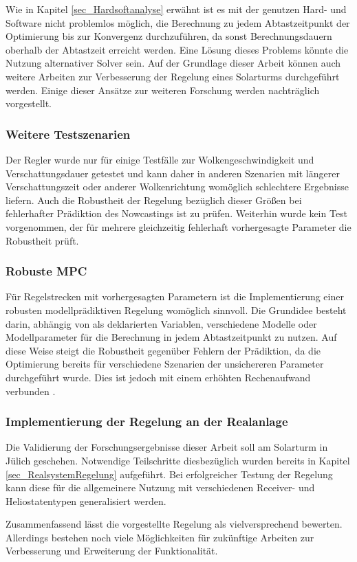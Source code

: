 Wie in Kapitel \ref{sec_Hardsoftanalyse} erwähnt ist es mit der genutzen Hard- und Software nicht problemlos möglich, die Berechnung zu jedem Abtastzeitpunkt der Optimierung bis zur Konvergenz durchzuführen, da sonst Berechnungsdauern oberhalb der Abtastzeit erreicht werden.
Eine Lösung dieses Problems könnte die Nutzung alternativer Solver sein.
Auf der Grundlage dieser Arbeit können auch weitere Arbeiten zur Verbesserung der Regelung eines Solarturms durchgeführt werden.
Einige dieser Ansätze zur weiteren Forschung werden nachträglich vorgestellt.

\subsubsection*{Weitere Testszenarien}
Der Regler wurde nur für einige Testfälle zur Wolkengeschwindigkeit und Verschattungsdauer getestet und kann daher in anderen Szenarien mit längerer Verschattungszeit oder anderer Wolkenrichtung womöglich schlechtere Ergebnisse liefern.
Auch die Robustheit der Regelung bezüglich dieser Größen bei fehlerhafter Prädiktion des Nowcastings ist zu prüfen.
Weiterhin wurde kein Test vorgenommen, der für mehrere gleichzeitig fehlerhaft vorhergesagte Parameter die Robustheit prüft.

\subsubsection*{Robuste MPC}
Für Regelstrecken mit vorhergesagten Parametern ist die Implementierung einer robusten modellprädiktiven Regelung womöglich sinnvoll.
Die Grundidee besteht darin, abhängig von als  deklarierten Variablen, verschiedene Modelle oder Modellparameter für die Berechnung in jedem Abtastzeitpunkt zu nutzen.
Auf diese Weise steigt die Robustheit gegenüber Fehlern der Prädiktion, da die Optimierung bereits für verschiedene Szenarien der unsichereren Parameter durchgeführt wurde.
Dies ist jedoch mit einem erhöhten Rechenaufwand verbunden \cite[S.6ff]{Schwenzer}.

\subsubsection*{Implementierung der Regelung an der Realanlage}
Die Validierung der Forschungsergebnisse dieser Arbeit soll am Solarturm in Jülich geschehen.
Notwendige Teilschritte diesbezüglich wurden bereits in Kapitel \ref{sec_RealsystemRegelung} aufgeführt.
Bei erfolgreicher Testung der Regelung kann diese für die allgemeinere Nutzung mit verschiedenen Receiver- und Heliostatentypen generalisiert werden.

Zusammenfassend lässt die vorgestellte Regelung als vielversprechend bewerten.
Allerdings bestehen noch viele Möglichkeiten für zukünftige Arbeiten zur Verbesserung und Erweiterung der Funktionalität.
